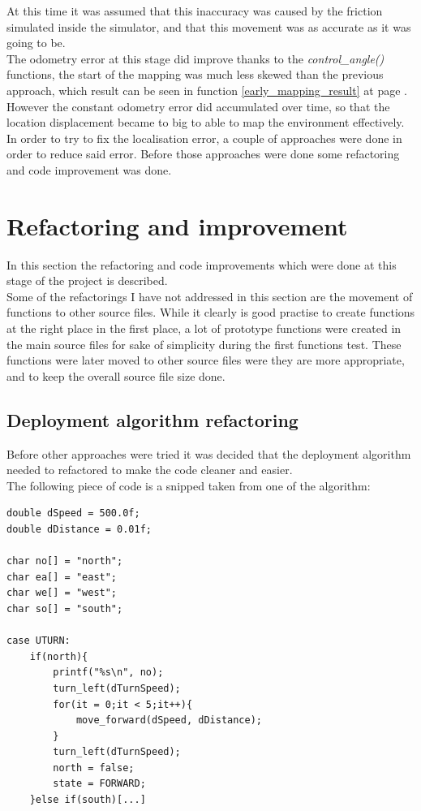 At this time it was assumed that this inaccuracy was caused by the friction simulated inside the simulator, and that this movement was as accurate as it was going to be. \\
The odometry error at this stage did improve thanks to the \textit{control\_angle()} functions, the start of the mapping was much less skewed than the previous approach, which result can be seen in function \ref{early_mapping_result} at page \pageref{early_mapping_result}. \\[3ex]

However the constant odometry error did accumulated over time, so that the location displacement became to big to able to map the environment effectively. \\
In order to try to fix the localisation error, a couple of approaches were done in order to reduce said error. Before those approaches were done some refactoring and code improvement was done.

\section{Refactoring and improvement}
In this section the refactoring and code improvements which were done at this stage of the project is described. \\
Some of the refactorings I have not addressed in this section are the movement of functions to other source files.
While it clearly is good practise to create functions at the right place in the first place, a lot of prototype functions were created in the main source files for sake of simplicity during the first functions test. These functions were later moved to other source files were they are more appropriate, and to keep the overall source file size done.

\subsection{Deployment algorithm refactoring}
Before other approaches were tried it was decided that the deployment algorithm needed to refactored to make the code cleaner and easier. \\
The following piece of code is a snipped taken from one of the algorithm:

\begin{lstlisting}[caption={Deployment algorithm refactoring}]
double dSpeed = 500.0f;
double dDistance = 0.01f;

char no[] = "north";
char ea[] = "east";
char we[] = "west";
char so[] = "south";

case UTURN:
    if(north){
        printf("%s\n", no);
        turn_left(dTurnSpeed);
        for(it = 0;it < 5;it++){
            move_forward(dSpeed, dDistance);
        }
        turn_left(dTurnSpeed);
        north = false;
        state = FORWARD;
    }else if(south)[...]
\end{lstlisting}

